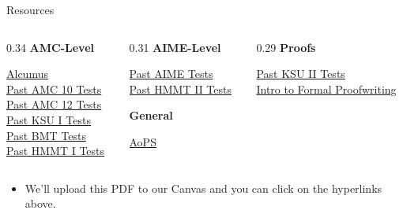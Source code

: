 \documentclass[aspectratio=169,xcolor=dvipsnames]{beamer}
\begin{document}

\begin{frame}[t]{Resources}
\footnotesize
\begin{columns}[T,onlytextwidth]
    \begin{column}{0.34\textwidth}
        \textbf{AMC-Level}\par\vspace{0.35em}
        \href{https://artofproblemsolving.com/alcumus}{Alcumus}\\[0.25em]
        \href{https://artofproblemsolving.com/wiki/index.php/AMC_10_Problems_and_Solutions}{Past AMC 10 Tests}\\[0.25em]
        \href{https://artofproblemsolving.com/wiki/index.php/AMC_12_Problems_and_Solutions}{Past AMC 12 Tests}\\[0.25em]
        \href{https://www.kennesaw.edu/csm/academics/mathematics/ksu-mathematics-competition.php}{Past KSU I Tests}\\[0.25em]
        \href{https://berkeley.mt/archives/}{Past BMT Tests}\\[0.25em]
        \href{https://www.hmmt.org/www/archive/results}{Past HMMT I Tests}
    \end{column}

    \begin{column}{0.31\textwidth}
        \textbf{AIME-Level}\par\vspace{0.35em}
        \href{https://artofproblemsolving.com/wiki/index.php/AIME_Problems_and_Solutions}{Past AIME Tests}\\[0.25em]
        \href{https://www.hmmt.org/www/archive/results}{Past HMMT II Tests}

        \vspace{1.1em}
        \textbf{General}\par\vspace{0.35em}
        \href{https://artofproblemsolving.com/}{AoPS}
    \end{column}

    \begin{column}{0.29\textwidth}
        \textbf{Proofs}\par\vspace{0.35em}
        \href{https://www.kennesaw.edu/csm/academics/mathematics/ksu-mathematics-competition.php}{Past KSU II Tests}\\[0.25em]
        \href{https://math.berkeley.edu/~hutching/teach/proofs.pdf}{Intro to Formal Proofwriting}
    \end{column}
\end{columns}
\vspace{6em}
\begin{itemize}
    \item We'll upload this PDF to our Canvas and you can click on the hyperlinks above.
\end{itemize}
\end{frame}
\end{document}
